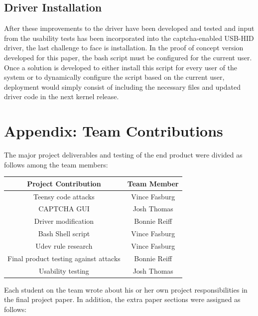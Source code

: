 \documentclass[pagenumbers]{ieee}
\begin{document}
\subsection{Driver Installation}
\label{section:installation}

After these improvements to the driver have been developed and tested and input from the usability tests has been incorporated into the captcha-enabled USB-HID driver, the last challenge to face is installation. In the proof of concept version developed for this paper, the bash script must be configured for the current user. Once a solution is developed to either install this script for every user of the system or to dynamically configure the script based on the current user, deployment would simply consist of including the necessary files and updated driver code in the next kernel release.



\appendix 


\section{Appendix: Team Contributions}

The major project deliverables and testing of the end product were divided as follows among the team members:

\begin{center}
	\begin{tabular}{ | c | c | }
		\hline \textbf{Project Contribution} & \textbf{Team Member} \\ \hline
		Teensy code attacks & Vince Fasburg \\ \hline
		CAPTCHA GUI & Josh Thomas \\ \hline
		Driver modification & Bonnie Reiff \\ \hline
		Bash Shell script & Vince Fasburg \\ \hline
		Udev rule research & Vince Fasburg \\ \hline
		Final product testing against attacks & Bonnie Reiff \\ \hline
		Usability testing & Josh Thomas \\ \hline
	\end{tabular}
\end{center}

Each student on the team wrote about his or her own project responsibilities in the final project paper. In addition, the extra paper sections were assigned as follows:
\end{document}
